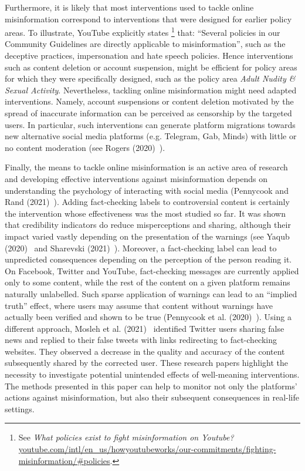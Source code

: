 \documentclass{article}
\begin{document}
Furthermore, it is likely that most interventions used to tackle online misinformation correspond to interventions that were designed for earlier policy areas.
To illustrate, YouTube explicitly states
\footnote{See {\it What policies exist to fight misinformation on Youtube?} \href{https://www.youtube.com/intl/en\_us/howyoutubeworks/our-commitments/fighting-misinformation/\#policies}{youtube.com/intl/en\_us/howyoutubeworks/our-commitments/fighting-misinformation/\#policies}.}
that: ``Several policies in our Community Guidelines are directly applicable to misinformation'', such as the deceptive practices, impersonation and hate speech policies.
Hence interventions such as content deletion or account suspension, might be efficient for policy areas for which they were specifically designed, such as the policy area {\it Adult Nudity \& Sexual Activity}. Nevertheless, tackling online misinformation might need adapted interventions.
Namely, account suspensions or content deletion motivated by the spread of inaccurate information can be perceived as censorship by the targeted users. In particular, such interventions can generate platform migrations towards new alternative social media platforms (e.g. Telegram, Gab, Minds) with little or no content moderation (see Rogers (2020)~\cite{rogers2020}).

\smallskip

Finally, the means to tackle online misinformation is an active area of research and developing effective interventions against misinformation depends on understanding the psychology of interacting with social media (Pennycook and Rand (2021)~\cite{pennycook2021psychology}). 
Adding fact-checking labels to controversial content is certainly the intervention whose effectiveness was the most studied so far. 
It was shown that credibility indicators do reduce misperceptions and sharing, although their impact varied vastly depending on the presentation of the warnings (see Yaqub (2020)~\cite{yaqub2020effects} and Sharevski (2021)~\cite{sharevski2021misinformation}).
Moreover, a fact-checking label can lead to unpredicted consequences depending on the perception of the person reading it.
On Facebook, Twitter and YouTube, fact-checking messages are currently applied only to some content, while the rest of the content on a given platform remains naturally unlabelled. 
Such sparse application of warnings can lead to an ``implied truth'' effect, where users may assume that content without warnings have actually been verified and shown to be true (Pennycook et al. (2020)~\cite{pennycook2020implied}).
Using a different approach, Mosleh et al. (2021)~\cite{mosleh2021perverse} identified Twitter users sharing false news and replied to their false tweets with links redirecting to fact-checking websites.
They observed a decrease in the quality and accuracy of the content subsequently shared by the corrected user. 
These research papers highlight the necessity to investigate potential unintended effects of well-meaning interventions.
The methods presented in this paper can help to monitor not only the platforms' actions against misinformation, but also their subsequent consequences in real-life settings.
\end{document}
